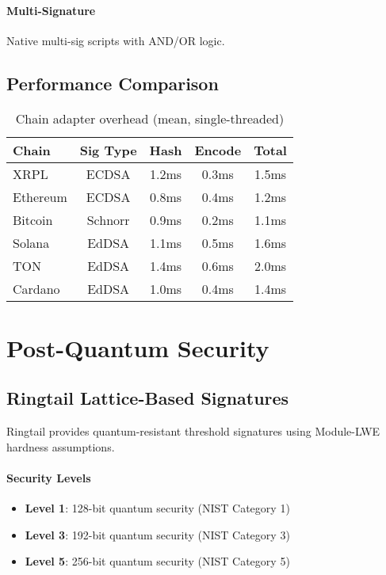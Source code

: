 \documentclass[11pt,twocolumn]{article}
\begin{document}
\paragraph{Multi-Signature} Native multi-sig scripts with AND/OR logic.

\subsection{Performance Comparison}

\begin{table}[h]
\centering
\small
\begin{tabular}{@{}lcccc@{}}
\toprule
\textbf{Chain} & \textbf{Sig Type} & \textbf{Hash} & \textbf{Encode} & \textbf{Total} \\
\midrule
XRPL & ECDSA & 1.2ms & 0.3ms & 1.5ms \\
Ethereum & ECDSA & 0.8ms & 0.4ms & 1.2ms \\
Bitcoin & Schnorr & 0.9ms & 0.2ms & 1.1ms \\
Solana & EdDSA & 1.1ms & 0.5ms & 1.6ms \\
TON & EdDSA & 1.4ms & 0.6ms & 2.0ms \\
Cardano & EdDSA & 1.0ms & 0.4ms & 1.4ms \\
\bottomrule
\end{tabular}
\caption{Chain adapter overhead (mean, single-threaded)}
\label{tab:adapter_performance}
\end{table}

\section{Post-Quantum Security}

\subsection{Ringtail Lattice-Based Signatures}

Ringtail provides quantum-resistant threshold signatures using Module-LWE hardness assumptions.

\paragraph{Security Levels}
\begin{itemize}
\item \textbf{Level 1}: 128-bit quantum security (NIST Category 1)
\item \textbf{Level 3}: 192-bit quantum security (NIST Category 3)
\item \textbf{Level 5}: 256-bit quantum security (NIST Category 5)
\end{itemize}
\end{document}
